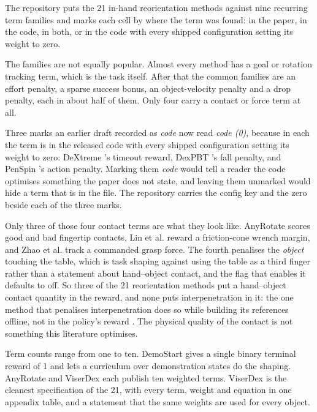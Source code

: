 \label{sec:train:rl:reward}
The repository puts the 21 in-hand reorientation methods against nine recurring term families and
marks each cell by where the term was found: in the paper, in the code, in both, or in the code
with every shipped configuration setting its weight to zero.


The families are not equally popular. Almost every method has a goal or rotation tracking term,
which is the task itself. After that the common families are an effort penalty, a sparse success
bonus, an object-velocity penalty and a drop penalty, each in about half of them. Only four carry a
contact or force term at all.

Three marks an earlier draft recorded as \emph{code} now read \emph{code (0)}, because in each the
term is in the released code with every shipped configuration setting its weight to zero: DeXtreme
\cite{dextreme_2022}'s timeout reward, DexPBT \cite{dexpbt_2023}'s fall penalty, and PenSpin
\cite{penspin_2024}'s action penalty. Marking them \emph{code} would tell a reader the code
optimises something the paper does not state, and leaving them unmarked would hide a term that is
in the file. The repository carries the config key and the zero beside each of the three marks.

Only three of those four contact terms are what they look like. AnyRotate \cite{anyrotate_2024}
scores good and bad fingertip contacts, Lin et al. \cite{poise_2026} reward a friction-cone wrench
margin, and Zhao et al. \cite{force_grasp_sim2real_2026} track a commanded grasp force. The fourth
\cite{visual_dexterity_2022} penalises the \emph{object} touching the table, which is task shaping
against using the table as a third finger rather than a statement about hand--object contact, and
the flag that enables it defaults to off. So three of the 21 reorientation methods put a
hand--object contact quantity in the reward, and none puts interpenetration in it: the one method
that penalises interpenetration does so while building its references offline, not in the policy's
reward \cite{teledexter_2026}. The physical quality of the contact is not something this literature
optimises.

Term counts range from one to ten. DemoStart \cite{demostart_2024} gives a single binary terminal
reward of 1 and lets a curriculum over demonstration states do the shaping. AnyRotate
\cite{anyrotate_2024} and ViserDex \cite{viserdex_2026} each publish ten weighted terms. ViserDex
is the cleanest specification of the 21, with every term, weight and equation in one appendix
table, and a statement that the same weights are used for every object.

